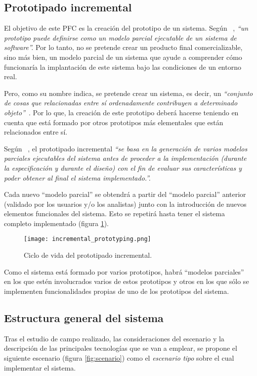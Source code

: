   \subsection{Prototipado incremental}
El objetivo de este \acs{PFC} es la creación del prototipo de un sistema.
Según ~\cite{bib:software_engineering}, \emph{``un prototipo puede definirse
como  un modelo parcial ejecutable de un sistema de software''.} Por lo tanto, 
no se pretende crear un producto final comercializable, sino más bien, un
modelo parcial de un sistema que ayude a comprender cómo funcionaría la
implantación de este sistema bajo las condiciones de un entorno real.

Pero, como su nombre indica, se pretende crear un sistema, es decir, un
\emph{``conjunto de cosas que relacionadas entre sí ordenadamente contribuyen 
a determinado objeto''}~\cite{bib:rae}. Por lo que, la creación de este 
prototipo deberá hacerse teniendo en cuenta que está formado por otros 
prototipos más elementales que están relacionados entre sí.

Según ~\cite{bib:software_engineering}, el prototipado incremental
\emph{``se basa en la generación de varios modelos parciales ejecutables del 
sistema antes de proceder a la implementación (durante la especificación y 
durante el diseño) con el fin de evaluar sus características y poder obtener al 
final el sistema implementado.''.}

Cada nuevo ``modelo parcial'' se obtendrá a partir del ``modelo parcial''
anterior (validado por los usuarios y/o los analistas) junto con la
introducción de nuevos elementos funcionales del sistema. Esto se repetirá
hasta tener el sistema completo implementado (figura
\ref{fig:incremental_prototyping}).

\begin{figure}[!h]
  \begin{center}
    \texttt{[image: incremental\_prototyping.png]}
    \caption{Ciclo de vida del prototipado incremental.}
    \label{fig:incremental_prototyping}
  \end{center}
\end{figure}

Como el sistema está formado por varios prototipos, habrá ``modelos parciales''
en los que estén involucrados varios de estos prototipos y otros en los que
sólo se implementen funcionalidades propias de uno de los prototipos del
sistema.

  \subsection{Estructura general del sistema}
Tras el estudio de campo realizado, las consideraciones del escenario y la
descripción de las principales tecnologías que se van a emplear, se propone
el siguiente escenario (figura \ref{fig:scenario}) como el \emph{escenario
tipo} sobre el cual implementar el sistema.

